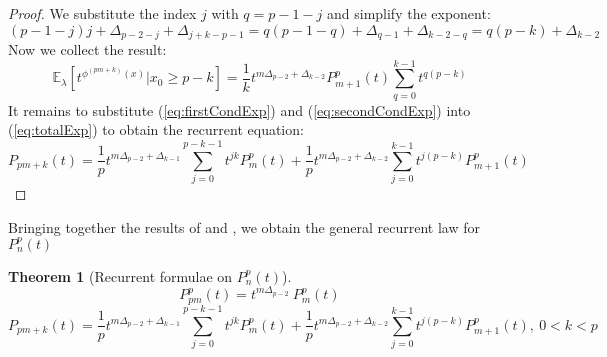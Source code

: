 \documentclass[a4paper]{article}
\theoremstyle{plain}
\newtheorem{theorem}{Theorem}[section]
\theoremstyle{definition}
\begin{document}
\begin{proof}
We substitute the index $j$ with $q = p-1-j$ and simplify the exponent:
$$  (p-1-j) j + \Delta_{p-2-j} + \Delta_{j+k-p-1} =
    q(p-1-q) + \Delta_{q-1} + \Delta_{k-2-q}=
   q(p-k)+\Delta_{k-2} 
$$   
Now we collect the result: 
\begin{equation}\label{eq:secondCondExp}
\mathbb{E}_\lambda\left[ t^{\phi^{(pm+k)}(x)}| x_0 \ge p-k \right] 
 =  \frac{1}{k} t^{m\Delta_{p-2} + \Delta_{k-2}} P_{m+1}^p(t)
  \sum\limits_{q=0}^{k-1} t^{q(p-k)}
  \end{equation}
It remains to substitute (\ref{eq:firstCondExp}) and (\ref{eq:secondCondExp}) into (\ref{eq:totalExp}) to obtain the recurrent equation:
$$P_{pm+k}(t)  =   \frac{1}{p} t^{m\Delta_{p-2} + \Delta_{k-1}}\sum\limits_{j=0}^{p-k-1} t^{jk} P_m^p(t) 
      + \frac{1}{p} t^{m\Delta_{p-2} + \Delta_{k-2}}\sum\limits_{j=0}^{k-1} t^{j(p-k)} P_{m+1}^p(t) $$
\end{proof}
Bringing together the results of  and , we obtain the general recurrent law for $P_{n}^p(t)$
\begin{theorem}[Recurrent formulae on $P_{n}^p(t)$] 
$$ P_{pm}^p(t)  =  t^{m\Delta_{p-2}}\ P_m^p(t) $$
$$ P_{pm+k}(t)  =   \frac{1}{p} t^{m\Delta_{p-2} + \Delta_{k-1}}\sum\limits_{j=0}^{p-k-1} t^{jk} P_m^p(t)  + \frac{1}{p} t^{m\Delta_{p-2} + \Delta_{k-2}}\sum\limits_{j=0}^{k-1} t^{j(p-k)} P_{m+1}^p(t), \ 0 < k < p $$
\end{theorem}
\end{document}
